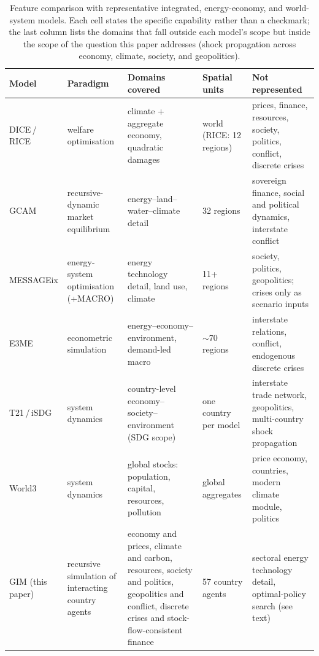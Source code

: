 \documentclass[a4paper,fleqn]{cas-sc}
\begin{document}
\begin{table}[t]
\centering
\caption{Feature comparison with representative integrated, energy-economy, and world-system
models. Each cell states the specific capability rather than a checkmark; the last column lists
the domains that fall outside each model's scope but inside the scope of the question this paper
addresses (shock propagation across economy, climate, society, and geopolitics).}
\label{tab:compare}
\small
\begin{tabularx}{\linewidth}{@{}l L L l L@{}}
\toprule
Model & Paradigm & Domains covered & Spatial units & Not represented \\
\midrule
DICE\,/\,RICE & welfare optimisation & climate + aggregate economy, quadratic damages & world (RICE: 12 regions) & prices, finance, resources, society, politics, conflict, discrete crises \\
GCAM & recursive-dynamic market equilibrium & energy--land--water--climate detail & 32 regions & sovereign finance, social and political dynamics, interstate conflict \\
MESSAGEix & energy-system optimisation (+MACRO) & energy technology detail, land use, climate & 11+ regions & society, politics, geopolitics; crises only as scenario inputs \\
E3ME & econometric simulation \citep{mercure2018} & energy--economy--environment, demand-led macro & $\sim$70 regions & interstate relations, conflict, endogenous discrete crises \\
T21\,/\,iSDG & system dynamics \citep{barney2002} & country-level economy--society--environment (SDG scope) & one country per model & interstate trade network, geopolitics, multi-country shock propagation \\
World3 & system dynamics \citep{meadows1972} & global stocks: population, capital, resources, pollution & global aggregates & price economy, countries, modern climate module, politics \\
GIM (this paper) & recursive simulation of interacting country agents & economy and prices, climate and carbon, resources, society and politics, geopolitics and conflict, discrete crises and stock-flow-consistent finance & 57 country agents & sectoral energy technology detail, optimal-policy search (see text) \\
\bottomrule
\end{tabularx}
\end{table}
\end{document}
